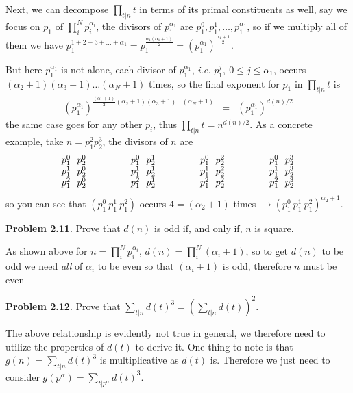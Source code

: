 \documentclass[aps,preprint,preprintnumbers,nofootinbib,showpacs,prd]{revtex4-1}
\newcommand{\ie}{{\it i.e.} }
\newcommand{\nbea}{\begin{eqnarray*}}
\newcommand{\neea}{\end{eqnarray*}}
\begin{document}
Next, we can decompose $\prod_{t|n} t$ in terms of its primal constituents as well, say we focus on $p_1$ of $\prod_i^N p_i^{\alpha_i}$, the divisors of $p_1^{\alpha_1}$ are $p_1^0, p_1^1, \ldots, p_1^{\alpha_1}$, so if we multiply all of them we have $p_1^{1 + 2 + 3 + \ldots + \alpha_1} = p_1^{\frac{\alpha_1(\alpha_1 + 1)}{2}} = \left ( p_1^{\alpha_1}\right )^{\frac{\alpha_1+1}{2}}$.

But here $p_1^{\alpha_1}$ is not alone, each divisor of $p_1^{\alpha_1}$, \ie $p_1^{j}, ~0 \le j \le \alpha_1$, occurs $(\alpha_2+1)(\alpha_3+1)\ldots(\alpha_N+1)$ times, so the final exponent for $p_1$ in $\prod_{t|n} t$ is
%
\nbea
\left (p_1^{\alpha_1}\right )^{\frac{(\alpha_1+1)}{2}(\alpha_2+1)(\alpha_3+1)\ldots(\alpha_N+1)} & = & \left (p_1^{\alpha_1}\right )^{d(n)/2}
\neea
%
the same case goes for any other $p_i$, thus $\prod_{t|n}t = n^{d(n)/2}$. As a concrete example, take $n = p_1^2p_2^3$, the divisors of $n$ are
%
\nbea
\begin{array}{c c c c c c c}
p_1^0 ~~ p_2^0 & ~~~~~~~~ & p_1^0 ~~ p_2^1 & ~~~~~~~~ & p_1^0 ~~ p_2^2 & ~~~~~~~~ & p_1^0 ~~ p_2^3 \\
p_1^1 ~~ p_2^0 & ~~~~~~~~ & p_1^1 ~~ p_2^1 & ~~~~~~~~ & p_1^1 ~~ p_2^2 & ~~~~~~~~ & p_1^1 ~~ p_2^3 \\
p_1^2 ~~ p_2^0 & ~~~~~~~~ & p_1^2 ~~ p_2^1 & ~~~~~~~~ & p_1^2 ~~ p_2^2 & ~~~~~~~~ & p_1^2 ~~ p_2^3
\end{array}
\neea
%
so you can see that $(p_1^0~p_1^1~p_1^2)$ occurs $4=(\alpha_2+1)$ times $\to (p_1^0~p_1^1~p_1^2)^{\alpha_2+1}$.

{\bf Problem 2.11}. Prove that $d(n)$ is odd if, and only if, $n$ is square.

As shown above for $n = \prod_i^N p_i^{\alpha_i}$, $d(n) = \prod_i^N (\alpha_i + 1)$, so to get $d(n)$ to be odd we need {\it all} of $\alpha_i$ to be even so that $(\alpha_i + 1)$ is odd, therefore $n$ must be even

{\bf Problem 2.12}. Prove that $\sum_{t|n} d(t)^3 = \left (\sum_{t|n} d(t)\right )^2$.

The above relationship is evidently not true in general, we therefore need to utilize the properties of $d(t)$ to derive it. One thing to note is that $g(n) = \sum_{t|n} d(t)^3$ is multiplicative as $d(t)$ is. Therefore we just need to consider $g(p^\alpha) = \sum_{t|p^\alpha} d(t)^3$.
\end{document}
